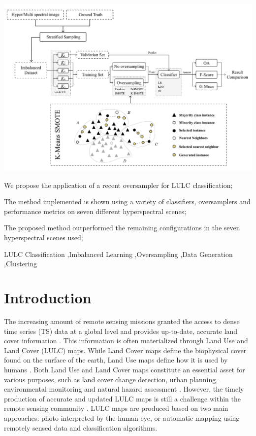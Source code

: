 \documentclass[preprint,12pt]{elsarticle}
\begin{document}
\begin{frontmatter}
\begin{graphicalabstract}
\centering
\includegraphics[width=\linewidth]{../analysis/graphical_abstract}
\end{graphicalabstract}

\begin{highlights}
\item We propose the application of a recent oversampler for LULC
    classification;
\item The method implemented is shown using a variety of classifiers,
    oversamplers and performance metrics on seven different hyperspectral
    scenes;
\item The proposed method outperformed the remaining configurations in
    the seven hyperspectral scenes used;
\end{highlights}

\begin{keyword}
    LULC Classification \sep Imbalanced Learning \sep Oversampling \sep Data
    Generation \sep Clustering
\end{keyword}

\end{frontmatter}

\section{Introduction}

The increasing amount of remote sensing missions granted the access to dense
time series (TS) data at a global level and provides up-to-date, accurate land
cover information \cite{Drusch2012}. This information is often materialized
through Land Use and Land Cover (LULC) maps. While Land Cover maps
define the biophysical cover found on the surface of the earth, Land Use maps
define how it is used by humans \cite{Fritz2017}. Both Land Use and Land Cover
maps constitute an essential asset for various purposes, such as land cover
change detection, urban planning, environmental monitoring and natural hazard
assessment \cite{Khatami2016}. However, the timely production of accurate and
updated LULC maps is still a challenge within the remote sensing community
\cite{Wulder2018}. LULC maps are produced based on two main approaches:
photo-interpreted by the human eye, or automatic mapping using remotely sensed
data and classification algorithms.
\end{document}

